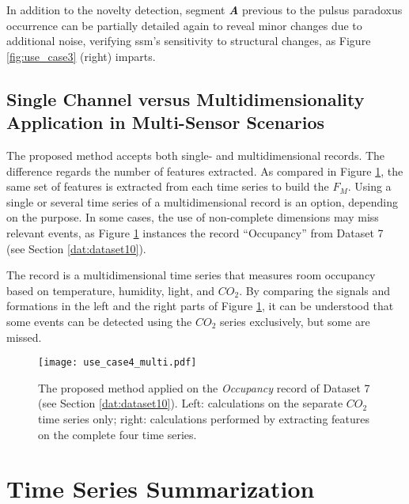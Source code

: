 In addition to the novelty detection, segment \textbf{\textit{A}} previous to the pulsus paradoxus occurrence can be partially detailed again to reveal minor changes due to additional noise, verifying \gls{ssm}'s sensitivity to structural changes, as Figure \ref{fig:use_case3} (right) imparts.

\subsection{Single Channel versus Multidimensionality Application in Multi-Sensor Scenarios}
\label{sec:multi_example}

The proposed method accepts both single- and multidimensional records. The difference regards the number of features extracted. As compared in Figure \ref{fig:use_case4}, the same set of features is extracted from each time series to build the $F_M$.
Using a single or several time series of a multidimensional record is an option, depending on the purpose. In some cases, the use of non-complete dimensions may miss relevant events, as Figure \ref{fig:use_case4} instances the record ``Occupancy'' from Dataset 7 (see Section \ref{dat:dataset10}). 

The record is a multidimensional time series that measures room occupancy based on temperature, humidity, light, and $CO_2$. By comparing the signals and formations in the left and the right parts of Figure \ref{fig:use_case4}, it can be understood that some events can be detected using the $CO_2$ series exclusively, but some are missed.

\begin{figure}
    \centering
    \texttt{[image: use\_case4\_multi.pdf]}
    \caption{The proposed method applied on the \textit{Occupancy} record of Dataset 7 (see Section \ref{dat:dataset10}). Left: calculations on the separate $CO_2$ time series only; right: calculations performed by extracting features on the complete four time series.}
    \label{fig:use_case4}
\end{figure}

\section{Time Series Summarization}

